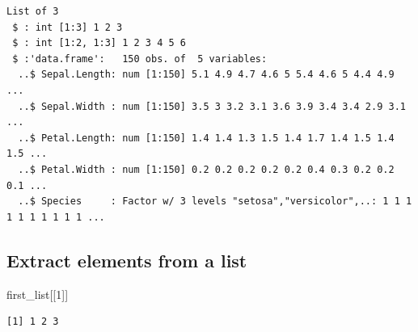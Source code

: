\documentclass[
  letterpaper,
  DIV=11,
  numbers=noendperiod]{scrreprt}
\newenvironment{Shaded}{\begin{snugshade}}{\end{snugshade}}
\newcommand{\DecValTok}[1]{\textcolor[rgb]{0.68,0.00,0.00}{#1}}
\newcommand{\NormalTok}[1]{\textcolor[rgb]{0.00,0.23,0.31}{#1}}
\newcommand{\SpecialCharTok}[1]{\textcolor[rgb]{0.37,0.37,0.37}{#1}}
\begin{document}
\begin{verbatim}
List of 3
 $ : int [1:3] 1 2 3
 $ : int [1:2, 1:3] 1 2 3 4 5 6
 $ :'data.frame':   150 obs. of  5 variables:
  ..$ Sepal.Length: num [1:150] 5.1 4.9 4.7 4.6 5 5.4 4.6 5 4.4 4.9 ...
  ..$ Sepal.Width : num [1:150] 3.5 3 3.2 3.1 3.6 3.9 3.4 3.4 2.9 3.1 ...
  ..$ Petal.Length: num [1:150] 1.4 1.4 1.3 1.5 1.4 1.7 1.4 1.5 1.4 1.5 ...
  ..$ Petal.Width : num [1:150] 0.2 0.2 0.2 0.2 0.2 0.4 0.3 0.2 0.2 0.1 ...
  ..$ Species     : Factor w/ 3 levels "setosa","versicolor",..: 1 1 1 1 1 1 1 1 1 1 ...
\end{verbatim}

\subsection{Extract elements from a
list}\label{extract-elements-from-a-list}

\begin{Shaded}
\begin{Highlighting}[]
\NormalTok{first\_list[[}\DecValTok{1}\NormalTok{]]}
\end{Highlighting}
\end{Shaded}

\begin{verbatim}
[1] 1 2 3
\end{verbatim}

\begin{Shaded}
\end{Shaded}
\end{document}
